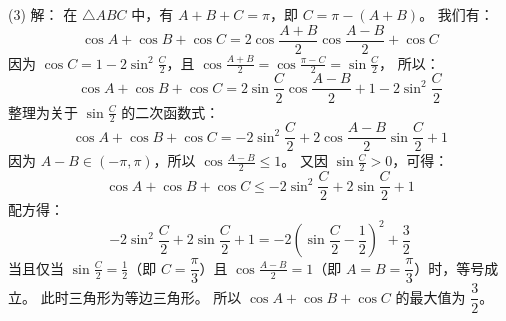 {  (3) 解：
  在 \(\triangle ABC\) 中，有 \(A + B + C = \pi\)，即 \(C = \pi - (A+B)\)。
  我们有：
  \[ \cos A + \cos B + \cos C = 2\cos\frac{A+B}{2}\cos\frac{A-B}{2} + \cos C \]
  因为 \(\cos C = 1 - 2\sin^2\frac{C}{2}\)，且 \(\cos\frac{A+B}{2} = \cos\frac{\pi-C}{2} = \sin\frac{C}{2}\)，
  所以：
  \[ \cos A + \cos B + \cos C = 2\sin\frac{C}{2}\cos\frac{A-B}{2} + 1 - 2\sin^2\frac{C}{2} \]
  整理为关于 \(\sin\frac{C}{2}\) 的二次函数式：
  \[ \cos A + \cos B + \cos C = -2\sin^2\frac{C}{2} + 2\cos\frac{A-B}{2}\sin\frac{C}{2} + 1 \]
  因为 \(A-B \in (-\pi, \pi)\)，所以 \(\cos\frac{A-B}{2} \le 1\)。
  又因 \(\sin\frac{C}{2} > 0\)，可得：
  \[ \cos A + \cos B + \cos C \le -2\sin^2\frac{C}{2} + 2\sin\frac{C}{2} + 1 \]
  配方得：
  \[ -2\sin^2\frac{C}{2} + 2\sin\frac{C}{2} + 1 = -2\left(\sin\frac{C}{2} - \frac{1}{2}\right)^2 + \frac{3}{2} \]
  当且仅当 \(\sin\frac{C}{2} = \frac{1}{2}\)（即 \(C = \dfrac{\pi}{3}\)）且 \(\cos\frac{A-B}{2} = 1\)（即 \(A = B = \dfrac{\pi}{3}\)）时，等号成立。
  此时三角形为等边三角形。
  所以 \(\cos A + \cos B + \cos C\) 的最大值为 \(\dfrac{3}{2}\)。%
}

